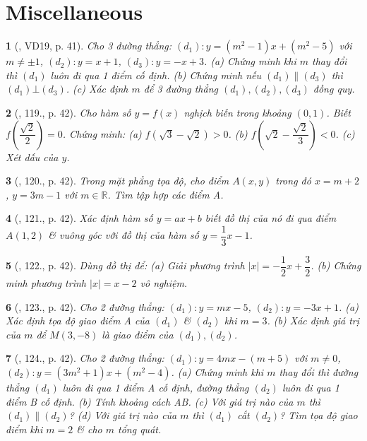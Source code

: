 \documentclass{article}
\newtheorem{baitoan}{}
\begin{document}
\section{Miscellaneous}

\begin{baitoan}[\cite{Tuyen_Toan_9_old}, VD19, p. 41]
	Cho 3 đường thẳng: $(d_1):y = (m^2 - 1)x + (m^2 - 5)$ với $m\ne\pm1$, $(d_2):y = x + 1$, $(d_3):y = -x + 3$. (a) Chứng minh khi $m$ thay đổi thì $(d_1)$ luôn đi qua 1 điểm cố định. (b) Chứng minh nếu $(d_1)\parallel(d_3)$ thì $(d_1)\bot(d_3)$. (c) Xác định $m$ để 3 đường thẳng $(d_1),(d_2),(d_3)$ đồng quy.
\end{baitoan}

\begin{baitoan}[\cite{Tuyen_Toan_9_old}, 119., p. 42]
	Cho hàm số $y = f(x)$ nghịch biến trong khoảng $(0,1)$. Biết $f\left(\dfrac{\sqrt{2}}{2}\right) = 0$. Chứng minh: (a) $f(\sqrt{3} - \sqrt{2}) > 0$. (b) $f\left(\sqrt{2} - \dfrac{\sqrt{2}}{3}\right) < 0$. (c) Xét dấu của $y$.
\end{baitoan}

\begin{baitoan}[\cite{Tuyen_Toan_9_old}, 120., p. 42]
	Trong mặt phẳng tọa độ, cho điểm $A(x,y)$ trong đó $x = m + 2$, $y = 3m - 1$ với $m\in\mathbb{R}$. Tìm tập hợp các điểm A.
\end{baitoan}

\begin{baitoan}[\cite{Tuyen_Toan_9_old}, 121., p. 42]
	Xác định hàm số $y = ax + b$ biết đồ thị của nó đi qua điểm $A(1,2)$ \& vuông góc với đồ thị của hàm số $y = \dfrac{1}{3}x - 1$.
\end{baitoan}

\begin{baitoan}[\cite{Tuyen_Toan_9_old}, 122., p. 42]
	Dùng đồ thị để: (a) Giải phương trình $|x| = -\dfrac{1}{2}x + \dfrac{3}{2}$. (b) Chứng minh phương trình $|x| = x - 2$ vô nghiệm.
\end{baitoan}

\begin{baitoan}[\cite{Tuyen_Toan_9_old}, 123., p. 42]
	Cho 2 đường thẳng: $(d_1): y = mx - 5$, $(d_2):y = -3x + 1$. (a) Xác định tọa độ giao điểm A của $(d_1)$ \& $(d_2)$ khi $m = 3$. (b) Xác định giá trị của $m$ để $M(3,-8)$ là giao điểm của $(d_1),(d_2)$.
\end{baitoan}

\begin{baitoan}[\cite{Tuyen_Toan_9_old}, 124., p. 42]
	Cho 2 đường thẳng: $(d_1):y = 4mx - (m + 5)$ với $m\ne0$, $(d_2):y = (3m^2 + 1)x + (m^2 - 4)$. (a) Chứng minh khi $m$ thay đổi thì đường thẳng $(d_1)$ luôn đi qua 1 điểm A cố định, đường thẳng $(d_2)$ luôn đi qua 1 điểm B cố định. (b) Tính khoảng cách AB. (c) Với giá trị nào của $m$ thì $(d_1)\parallel(d_2)$? (d) Với giá trị nào của $m$ thì $(d_1)$ cắt $(d_2)$? Tìm tọa độ giao điểm khi $m = 2$ \& cho $m$ tổng quát.
\end{baitoan}
\end{document}
